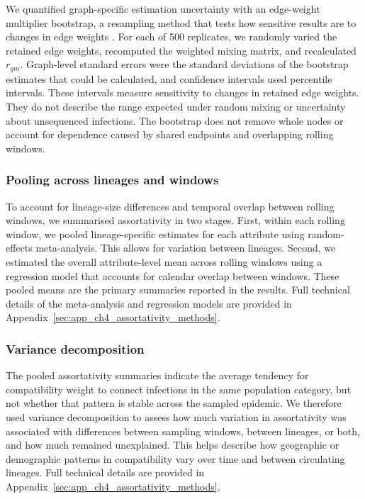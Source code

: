 We quantified graph-specific estimation uncertainty with an edge-weight multiplier bootstrap, a resampling method that tests how sensitive results are to changes in edge weights \citep{Efron1979,Praestgaard1993}. For each of 500 replicates, we randomly varied the retained edge weights, recomputed the weighted mixing matrix, and recalculated $r_{gm}$. Graph-level standard errors were the standard deviations of the bootstrap estimates that could be calculated, and confidence intervals used percentile intervals. These intervals measure sensitivity to changes in retained edge weights. They do not describe the range expected under random mixing or uncertainty about unsequenced infections. The bootstrap does not remove whole nodes or account for dependence caused by shared endpoints and overlapping rolling windows.

\subsubsection*{Pooling across lineages and windows}\label{sec:ch4_assortativity_meta}

To account for lineage-size differences and temporal overlap between rolling windows, we summarised assortativity in two stages. First, within each rolling window, we pooled lineage-specific estimates for each attribute using random-effects meta-analysis. This allows for variation between lineages. Second, we estimated the overall attribute-level mean across rolling windows using a regression model that accounts for calendar overlap between windows. These pooled means are the primary summaries reported in the results. Full technical details of the meta-analysis and regression models are provided in Appendix~\ref{sec:app_ch4_assortativity_methods}.

\subsubsection*{Variance decomposition}\label{sec:ch4_assortativity_variance_decomp}

The pooled assortativity summaries indicate the average tendency for compatibility weight to connect infections in the same population category, but not whether that pattern is stable across the sampled epidemic. We therefore used variance decomposition to assess how much variation in assortativity was associated with differences between sampling windows, between lineages, or both, and how much remained unexplained. This helps describe how geographic or demographic patterns in compatibility vary over time and between circulating lineages. Full technical details are provided in Appendix~\ref{sec:app_ch4_assortativity_methods}.

